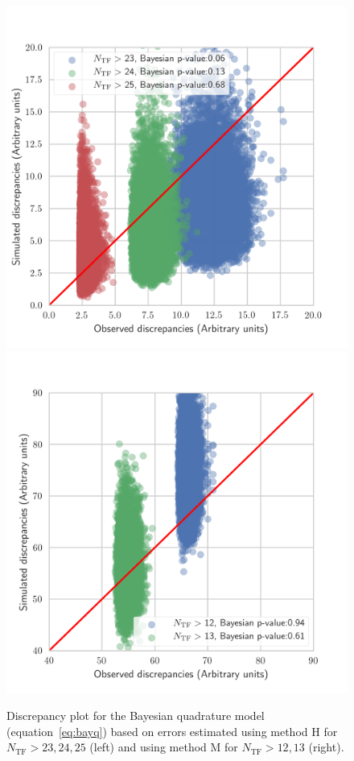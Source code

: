 \documentclass[a4paper,fleqn,usenatbib]{mnras}
\begin{document}
\begin{figure}
	\includegraphics[scale=0.69]{discq.png}
	\includegraphics[scale=0.69]{discq2.png}
    \caption{Discrepancy plot for the Bayesian quadrature model (equation~\ref{eq:bayq}) based on errors estimated using method H for $N_\mathrm{TF}>23,24,25$ (left) and using method M for $N_\mathrm{TF}>12,13$ (right).}
    \label{fig:discq}
\end{figure}
\end{document}
